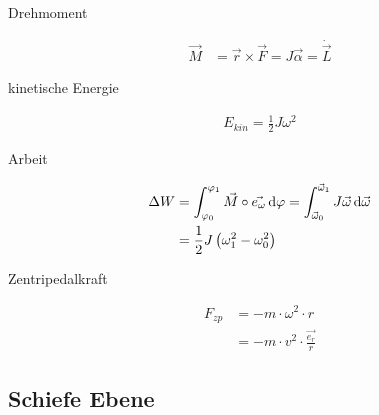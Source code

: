 \begin{boxleft}Drehmoment
\end{boxleft}\begin{boxrightshaded}
\begin{align}
\vec{M}&=\vec{r}\times\vec{F}=J\vec{\alpha}=\dot{\vec{L}}
\end{align}
\end{boxrightshaded}

\begin{boxleft}kinetische Energie
\end{boxleft}\begin{boxrightshaded}
\begin{align}
E_{kin}=\frac{1}{2}J\omega^2
\end{align}
\end{boxrightshaded}

\begin{boxleft}Arbeit
\end{boxleft}\begin{boxrightshaded}
\begin{align}
\Delta W	&=\int_{\varphi_0}^{\varphi_1}\vec{M}\circ\vec{e_\omega}\mathop{}\!\mathrm{d} \varphi=\int_{\vec{\omega}_0}^{\vec{\omega}_1}J\vec{\omega}\mathop{}\!\mathrm{d}\vec{\omega}\\
&=\frac{1}{2}J\left(\omega_1^2-\omega_0^2\right)
\end{align}
\end{boxrightshaded}

\begin{boxleft}Zentripedalkraft
\end{boxleft}\begin{boxrightshaded}
\begin{align}
F_{zp}&=-m\cdot\omega^2\cdot r\\
&=-m\cdot v^2\cdot \frac{\vec{e_r}}{r}
\end{align}
\end{boxrightshaded}

\subsection{Schiefe Ebene}


